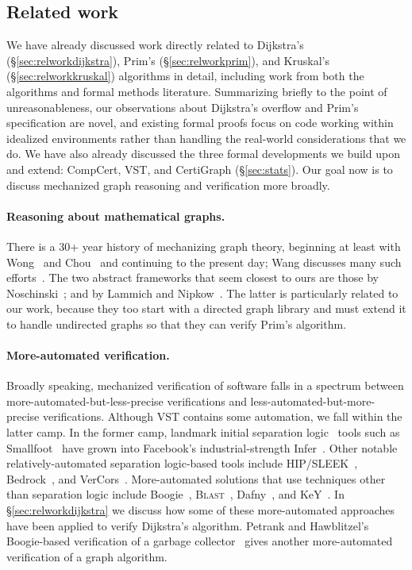 \subsection{Related work}

We have already discussed work directly related to Dijkstra's (\S\ref{sec:relworkdijkstra}), Prim's (\S\ref{sec:relworkprim}), and Kruskal's (\S\ref{sec:relworkkruskal}) algorithms in detail, including work from both the algorithms and formal methods literature.  Summarizing briefly to the point of unreasonableness, our observations about Dijkstra's overflow and Prim's specification are novel, and existing formal proofs focus on code working within idealized environments rather than handling the real-world considerations that we do.  We have also already discussed the three formal developments we
build upon and extend: CompCert, VST, and CertiGraph (\S\ref{sec:stats}).  Our goal now is to discuss mechanized graph reasoning and verification more broadly.

\paragraph{Reasoning about mathematical graphs.}
There is a 30+ year history of mechanizing graph theory, beginning at least with Wong~\cite{wong1991} and Chou~\cite{chou1994formal} and continuing to the present day; Wang discusses many such efforts~\cite[\S3.3]{shengyi:thesis}.  The two abstract frameworks that seem closest to ours are those by Noschinski~\cite{Noschinski2015}; and by Lammich and Nipkow~\cite{DBLP:journals/afp/LammichN19}.  The latter is particularly related to our work, because they too start with a directed graph library and must extend it to handle undirected graphs so that they can verify Prim's algorithm.

\paragraph{More-automated verification.}
Broadly speaking, mechanized verification of software falls in a spectrum between more-automated-but-less-precise verifications and less-automated-but-more-precise verifications.  Although VST contains some automation, we fall within the latter camp.  In the former camp, landmark initial separation logic~\cite{reynolds2002separation} tools such as Smallfoot~\cite{berdine:smallfoot} have grown into Facebook's industrial-strength Infer~\cite{calcagno2015moving}.  Other notable relatively-automated separation logic-based tools include HIP/SLEEK~\cite{chin:hipsleek}, Bedrock~\cite{chlipala:bedrock}, and VerCors~\cite{DBLP:conf/fm/BlomH14}.  More-automated solutions that use techniques other than separation logic include Boogie~\cite{barnett2005boogie}, \textsc{Blast}~\cite{DBLP:journals/sttt/BeyerHJM07}, Dafny~\cite{leino10}, and KeY~\cite{DBLP:series/lncs/10001}.  In \S\ref{sec:relworkdijkstra} we discuss how some of these more-automated approaches have been applied to verify Dijkstra's algorithm. Petrank and Hawblitzel's Boogie-based verification of a garbage collector~\cite{gcexample2} gives another more-automated verification of a graph algorithm.

